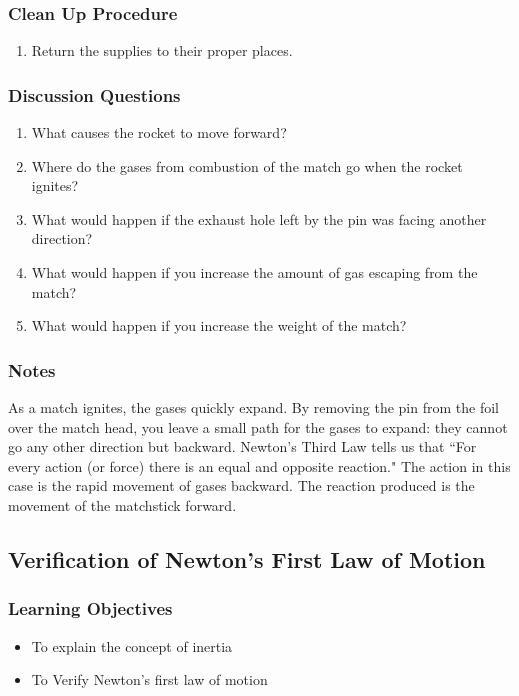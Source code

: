 \subsubsection*{Clean Up Procedure}
\begin{enumerate}
\item{Return the supplies to their proper places.} 
\end{enumerate}

\subsubsection*{Discussion Questions}
\begin{enumerate}
\item{What causes the rocket to move forward?}
\item{Where do the gases from combustion of the match go when the rocket ignites?}
\item{What would happen if the exhaust hole left by the pin was facing another direction?}
\item{What would happen if you increase the amount of gas escaping from the match?}
\item{What would happen if you increase the weight of the match?}
\end{enumerate}

\subsubsection*{Notes}
As a match ignites, the gases quickly expand. By removing the pin from the foil over the match head, you leave a small path for the gases to expand: they cannot go any other direction but backward. Newton's Third Law tells us that ``For every action (or force) there is an equal and opposite reaction." The action in this case is the rapid movement of gases backward. The reaction produced is the movement of the matchstick forward.

\subsection{Verification of Newton's First Law of Motion}

\subsubsection*{Learning Objectives}
\begin{itemize}
\item{To explain the concept of inertia} 
\item{To Verify Newton's first law of motion} 
\end{itemize}

